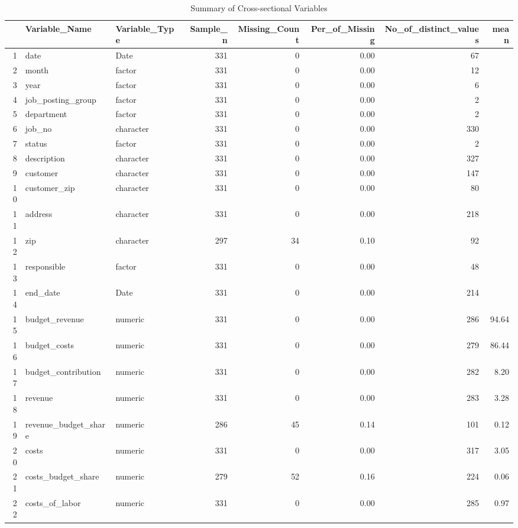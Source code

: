 \begin{sidewaystable}[ht]
\centering
\caption{Summary of Cross-sectional Variables} 
\begin{tabular}{rllrrrrr}
  \hline
 & Variable\_Name & Variable\_Type & Sample\_n & Missing\_Count & Per\_of\_Missing & No\_of\_distinct\_values & mean \\ 
  \hline
1 & date & Date & 331 &   0 & 0.00 &  67 &  \\ 
  2 & month & factor & 331 &   0 & 0.00 &  12 &  \\ 
  3 & year & factor & 331 &   0 & 0.00 &   6 &  \\ 
  4 & job\_posting\_group & factor & 331 &   0 & 0.00 &   2 &  \\ 
  5 & department & factor & 331 &   0 & 0.00 &   2 &  \\ 
  6 & job\_no & character & 331 &   0 & 0.00 & 330 &  \\ 
  7 & status & factor & 331 &   0 & 0.00 &   2 &  \\ 
  8 & description & character & 331 &   0 & 0.00 & 327 &  \\ 
  9 & customer & character & 331 &   0 & 0.00 & 147 &  \\ 
  10 & customer\_zip & character & 331 &   0 & 0.00 &  80 &  \\ 
  11 & address & character & 331 &   0 & 0.00 & 218 &  \\ 
  12 & zip & character & 297 &  34 & 0.10 &  92 &  \\ 
  13 & responsible & factor & 331 &   0 & 0.00 &  48 &  \\ 
  14 & end\_date & Date & 331 &   0 & 0.00 & 214 &  \\ 
  15 & budget\_revenue & numeric & 331 &   0 & 0.00 & 286 & 94.64 \\ 
  16 & budget\_costs & numeric & 331 &   0 & 0.00 & 279 & 86.44 \\ 
  17 & budget\_contribution & numeric & 331 &   0 & 0.00 & 282 & 8.20 \\ 
  18 & revenue & numeric & 331 &   0 & 0.00 & 283 & 3.28 \\ 
  19 & revenue\_budget\_share & numeric & 286 &  45 & 0.14 & 101 & 0.12 \\ 
  20 & costs & numeric & 331 &   0 & 0.00 & 317 & 3.05 \\ 
  21 & costs\_budget\_share & numeric & 279 &  52 & 0.16 & 224 & 0.06 \\ 
  22 & costs\_of\_labor & numeric & 331 &   0 & 0.00 & 285 & 0.97 \\ 

\end{tabular}
\end{sidewaystable}
